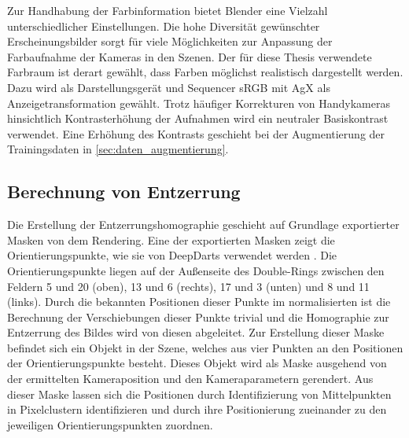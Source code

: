 Zur Handhabung der Farbinformation bietet Blender eine Vielzahl unterschiedlicher Einstellungen. Die hohe Diversität gewünschter Erscheinungsbilder sorgt für viele Möglichkeiten zur Anpassung der Farbaufnahme der Kameras in den Szenen. Der für diese Thesis verwendete Farbraum ist derart gewählt, dass Farben möglichst realistisch dargestellt werden. Dazu wird als Darstellungsgerät und Sequencer sRGB mit AgX als Anzeigetransformation gewählt. Trotz häufiger Korrekturen von Handykameras hinsichtlich Kontrasterhöhung der Aufnahmen wird ein neutraler Basiskontrast verwendet. Eine Erhöhung des Kontrasts geschieht bei der Augmentierung der Trainingsdaten in \autoref{sec:daten_augmentierung}.

\subsection{Berechnung von Entzerrung}  %
\label{sec:berechnung_entzerrung}

Die Erstellung der Entzerrungshomographie geschieht auf Grundlage exportierter Masken von dem Rendering. Eine der exportierten Masken zeigt die Orientierungspunkte, wie sie von DeepDarts verwendet werden \cite{deepdarts}. Die Orientierungspunkte liegen auf der Außenseite des Double-Rings zwischen den Feldern 5 und 20 (oben), 13 und 6 (rechts), 17 und 3 (unten) und 8 und 11 (links). Durch die bekannten Positionen dieser Punkte im normalisierten ist die Berechnung der Verschiebungen dieser Punkte trivial und die Homographie zur Entzerrung des Bildes wird von diesen abgeleitet. Zur Erstellung dieser Maske befindet sich ein Objekt in der Szene, welches aus vier Punkten an den Positionen der Orientierungspunkte besteht. Dieses Objekt wird als Maske ausgehend von der ermittelten Kameraposition und den Kameraparametern gerendert. Aus dieser Maske lassen sich die Positionen durch Identifizierung von Mittelpunkten in Pixelclustern identifizieren und durch ihre Positionierung zueinander zu den jeweiligen Orientierungspunkten zuordnen.
